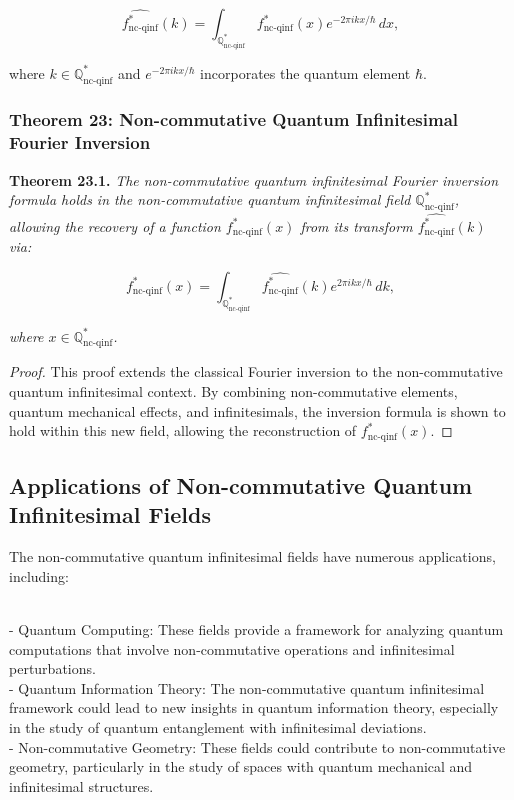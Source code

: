 \documentclass{article}
\begin{document}
\[
\widehat{f_{\text{nc-qinf}}^*}(k) = \int_{\mathbb{Q}_{\text{nc-qinf}}^*} f_{\text{nc-qinf}}^*(x) e^{-2\pi i k x / \hbar} \, dx,
\]

where \(k \in \mathbb{Q}_{\text{nc-qinf}}^*\) and \(e^{-2\pi i k x / \hbar}\) incorporates the quantum element \(\hbar\).

\subsubsection{Theorem 23: Non-commutative Quantum Infinitesimal Fourier Inversion}
\textbf{Theorem 23.1.} \textit{The non-commutative quantum infinitesimal Fourier inversion formula holds in the non-commutative quantum infinitesimal field \(\mathbb{Q}_{\text{nc-qinf}}^*\), allowing the recovery of a function \(f_{\text{nc-qinf}}^*(x)\) from its transform \(\widehat{f_{\text{nc-qinf}}^*}(k)\) via:}

\[
f_{\text{nc-qinf}}^*(x) = \int_{\mathbb{Q}_{\text{nc-qinf}}^*} \widehat{f_{\text{nc-qinf}}^*}(k) e^{2\pi i k x / \hbar} \, dk,
\]

\textit{where \(x \in \mathbb{Q}_{\text{nc-qinf}}^*\).}

\begin{proof}
This proof extends the classical Fourier inversion to the non-commutative quantum infinitesimal context. By combining non-commutative elements, quantum mechanical effects, and infinitesimals, the inversion formula is shown to hold within this new field, allowing the reconstruction of \(f_{\text{nc-qinf}}^*(x)\).
\end{proof}

\subsection{Applications of Non-commutative Quantum Infinitesimal Fields}
The non-commutative quantum infinitesimal fields have numerous applications, including:

{\ }\\
- Quantum Computing: These fields provide a framework for analyzing quantum computations that involve non-commutative operations and infinitesimal perturbations.
{\ }\\
- Quantum Information Theory: The non-commutative quantum infinitesimal framework could lead to new insights in quantum information theory, especially in the study of quantum entanglement with infinitesimal deviations.
{\ }\\
- Non-commutative Geometry: These fields could contribute to non-commutative geometry, particularly in the study of spaces with quantum mechanical and infinitesimal structures.
\end{document}
